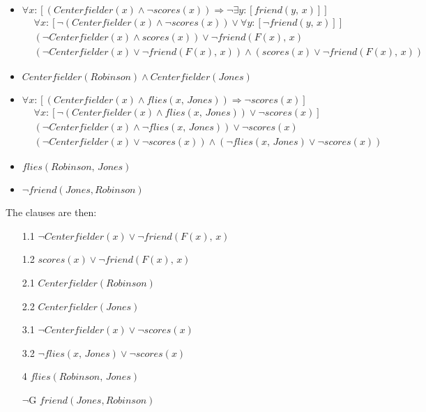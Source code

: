 \begin{itemize}
    \item $\forall x: \left[ (Centerfielder(x) \land \neg scores(x)) \Longrightarrow \neg \exists y: \left[friend(y,\,x)\right] \right]$
        \begin{align*}
            & \forall x: \left[ \neg (Centerfielder(x) \land \neg scores(x)) \lor \forall y: \left[\neg friend(y,\,x)\right] \right] \\
            & (\neg Centerfielder(x) \land scores(x)) \lor \neg friend(F(x),\,x) \\
            & (\neg Centerfielder(x) \lor \neg friend(F(x),\,x)) \land (scores(x) \lor \neg friend(F(x),\,x)) 
        \end{align*}

    \item $Centerfielder(Robinson) \land Centerfielder(Jones)$
    \item $\forall x: \left[ (Centerfielder(x) \land flies(x,\, Jones)) \Longrightarrow \neg scores(x) \right]$
        \begin{align*}
            & \forall x: \left[ \neg (Centerfielder(x) \land flies(x,\, Jones)) \lor \neg scores(x) \right] \\
            & (\neg Centerfielder(x) \land \neg flies(x,\, Jones)) \lor \neg scores(x) \\
            & (\neg Centerfielder(x) \lor \neg scores(x)) \land (\neg flies(x,\, Jones) \lor \neg scores(x))
        \end{align*}

    \item $flies(Robinson,\,Jones)$
    \item $\neg friend(Jones, Robinson)$
\end{itemize}

The clauses are then: 

\begin{enumerate}
    \item[1.1] $ \neg Centerfielder(x) \lor \neg frien d(F(x),\,x) $
    \item[1.2] $ scores(x) \lor \neg friend(F(x),\,x) $
    \item[2.1] $ Centerfielder(Robinson) $
    \item[2.2] $ Centerfielder(Jones) $
    \item[3.1] $ \neg Centerfielder(x) \lor \neg scores(x) $
    \item[3.2] $ \neg flies(x,\, Jones) \lor \neg scores(x) $
    \item[4] $ flies(Robinson,\,Jones) $
    \item[$\neg$G] $ friend(Jones, Robinson) $
\end{enumerate}

